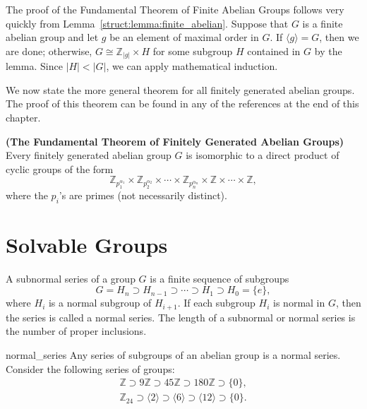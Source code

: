 \medskip


The proof of the Fundamental Theorem of Finite Abelian Groups follows
very quickly from Lemma~\ref{struct:lemma:finite_abelian}.  Suppose that $G$ is a finite abelian
group and let $g$ be an element of maximal order in $G$. If $\langle g
\rangle = G$, then we are done; otherwise, $G \cong {\mathbb Z}_{|g|}
\times H$ for some subgroup $H$ contained in $G$ by the lemma.  Since
$|H| < |G|$, we can apply mathematical induction.  
 
 
We now state the more general theorem for all finitely generated
abelian groups.  The proof of this theorem can be found in any of the 
references at the end of this chapter.
 
 
\begin{theorem}
{\bf (The Fundamental Theorem of Finitely Generated Abelian Groups)}
Every finitely generated abelian group $G$ is isomorphic to a direct
product of cyclic groups of the form 
\[
{\mathbb Z}_{p_1^{ \alpha_1 }}
\times
{\mathbb Z}_{p_2^{ \alpha_2 }}
\times
\cdots
\times
{\mathbb Z}_{p_n^{ \alpha_n }}
\times
{\mathbb Z}
\times \cdots \times
{\mathbb Z},
\]
where the $p_i$'s are primes (not necessarily distinct).
\end{theorem}

 
\section{Solvable Groups}

A {\bfi subnormal series\/} 
of a group $G$ is a finite sequence of subgroups 
\[
G = H_n \supset H_{n-1} \supset \cdots \supset H_1 \supset
H_0 = \{ e \},
\]
where $H_i$ is a normal subgroup of $H_{i+1}$. If each subgroup $H_i$
is normal in $G$, then the series is called a {\bfi normal
series}. The {\bfi length\/} of a 
subnormal or normal series is the number of proper inclusions. 
 

\begin{example}{normal_series}
Any series of subgroups of an abelian group is a normal series.
Consider the following  series of groups: 
\begin{gather*}
{\mathbb Z} \supset 9{\mathbb Z} \supset 45{\mathbb Z} \supset 180{\mathbb Z} 
\supset \{0\}, \\
{\mathbb Z}_{24} \supset \langle 2 \rangle \supset \langle 6 \rangle 
\supset \langle 12 \rangle
\supset \{0\}.
\end{gather*}
\end{example}
 
